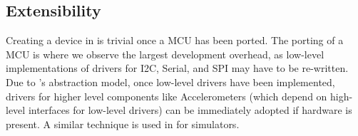 \subsection{Extensibility}

Creating a device in \CO is trivial once a MCU has been ported. The porting of a MCU is where we observe the largest development overhead, as low-level implementations of drivers for I2C, Serial, and SPI may have to be re-written. Due to \CON's abstraction model, once low-level drivers have been implemented, drivers for higher level components like Accelerometers (which depend on high-level interfaces for low-level drivers) can be immediately adopted if hardware is present. A similar technique is used in \MC for simulators.






